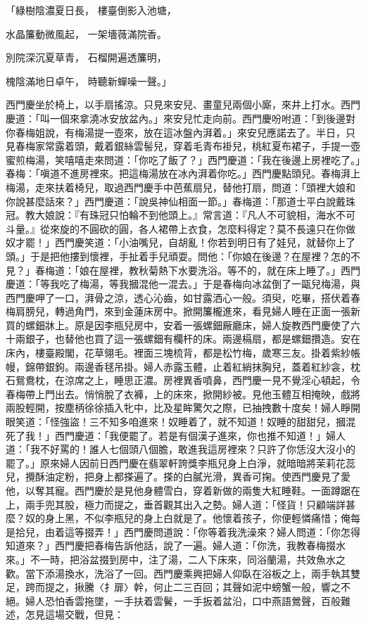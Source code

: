 \begin{showcontents}{}
「綠樹陰濃夏日長，  樓臺倒影入池塘，

水晶簾動微風起，  一架墻薇滿院香。

別院深沉夏草青，  石榴開遍透簾明，

槐陰滿地日卓午，  時聽新蟬噪一聲。」

西門慶坐於椅上，以手扇搖涼。只見來安兒、畫童兒兩個小廝，來井上打水。西門慶道：「叫一個來拿澆冰安放盆內。」來安兒忙走向前。西門慶吩咐道：「到後邊對你春梅姐說，有梅湯提一壺來，放在這冰盤內湃着。」來安兒應諾去了。半日，只見春梅家常露着頭，戴着銀絲雲髻兒，穿着毛青布褂兒，桃紅夏布裙子，手提一壺蜜煎梅湯，笑嘻嘻走來問道：「你吃了飯了？」西門慶道：「我在後邊上房裡吃了。」春梅：「嗔道不進房裡來。把這梅湯放在冰內湃着你吃。」西門慶點頭兒。春梅湃上梅湯，走來扶着椅兒，取過西門慶手中芭蕉扇兒，替他打扇，問道：「頭裡大娘和你說甚麼話來？」西門慶道：「說吳神仙相面一節。」春梅道：「那道士平白說戴珠冠。教大娘說：『有珠冠只怕輪不到他頭上。』常言道：『凡人不可貌相，海水不可斗量。』從來旋的不圓砍的圓，各人裙帶上衣食，怎麼料得定？莫不長遠只在你做奴才罷！」西門慶笑道：「小油嘴兒，自胡亂！你若到明日有了娃兒，就替你上了頭。」于是把他摟到懷裡，手扯着手兒頑耍。問他：「你娘在後邊？在屋裡？怎的不見？」春梅道：「娘在屋裡，教秋菊熱下水要洗浴。等不的，就在床上睡了。」西門慶道：「等我吃了梅湯，等我摑混他一混去。」于是春梅向冰盆倒了一甌兒梅湯，與西門慶呷了一口，湃骨之涼，透心沁齒，如甘露洒心一般。須臾，吃畢，搭伏着春梅肩膀兒，轉過角門，來到金蓮床房中。掀開簾櫳進來，看見婦人睡在正面一張新買的螺鈿牀上。原是因李瓶兒房中，安着一張螺鈿厰廳床，婦人旋教西門慶使了六十兩銀子，也替他也買了這一張螺鈿有欄杆的床。兩邊槅扇，都是螺鈿攢造。安在床內，樓臺殿閣，花草翎毛。裡面三塊梳背，都是松竹梅，歲寒三友。掛着紫紗帳幔，錦帶銀鉤。兩邊香毬吊掛。婦人赤露玉體，止着紅綃抹胸兒，蓋着紅紗衾，枕石鴛鴦枕，在涼席之上，睡思正濃。房裡異香噴鼻，西門慶一見不覺淫心頓起，令春梅帶上門出去。悄悄脫了衣褲，上的床來，掀開紗被。見他玉體互相掩映，戲將兩股輕開，按塵柄徐徐插入牝中，比及星眸驚欠之際，已抽拽數十度矣！婦人睜開眼笑道：「怪強盜！三不知多咱進來！奴睡着了，就不知道！奴睡的甜甜兒，摑混死了我！」西門慶道：「我便罷了。若是有個漢子進來，你也推不知道！」婦人道：「我不好罵的！誰人七個頭八個膽，敢進我這房裡來？只許了你恁沒大沒小的罷了。」原來婦人因前日西門慶在翡翠軒誇獎李瓶兒身上白淨，就暗暗將茉莉花蕊兒，攪酥油定粉，把身上都搽遍了。搽的白膩光滑，異香可掬。使西門慶見了愛他，以奪其寵。西門慶於是見他身體雪白，穿着新做的兩隻大紅睡鞋。一面蹲踞在上，兩手兜其股，極力而提之，垂首觀其出入之勢。婦人道：「怪貨！只顧端詳甚麼？奴的身上黑，不似李瓶兒的身上白就是了。他懷着孩子，你便輕憐痛惜；俺每是拾兒，由着這等掇弄！」西門慶問道說：「你等着我洗澡來？婦人問道：「你怎得知道來？」西門慶把春梅告訴他話，說了一遍。婦人道：「你洗，我教春梅掇水來。」不一時，把浴盆掇到房中，注了湯，二人下床來，同浴蘭湯，共效魚水之歡。當下添湯換水，洗浴了一回。西門慶乘興把婦人仰臥在浴板之上，兩手執其雙足，跨而提之，揪騰〈扌扉〉幹，何止二三百回；其聲如泥中螃蟹一般，響之不絕。婦人恐怕香雲拖墜，一手扶着雲鬢，一手扳着盆沿，口中燕語鶯聲，百般難述，怎見這場交戰，但見：


\end{showcontents}
